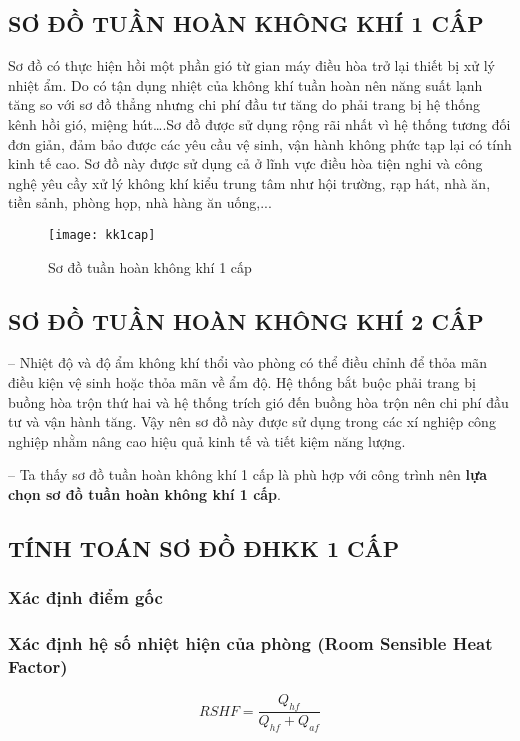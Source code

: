 \subsection{SƠ ĐỒ TUẦN HOÀN KHÔNG KHÍ 1 CẤP}
Sơ đồ có thực hiện hồi một phần gió từ gian máy điều hòa trở lại thiết bị xử lý nhiệt ẩm. Do có tận dụng nhiệt của không khí tuần hoàn nên năng suất lạnh tăng so với sơ đồ thẳng nhưng chi phí đầu tư tăng do phải trang bị hệ thống kênh hồi gió, miệng hút….Sơ đồ được sử dụng rộng rãi nhất vì hệ thống tương đối đơn giản, đảm bảo được các yêu cầu vệ sinh, vận hành không phức tạp lại có tính kinh tế cao. Sơ đồ này được sử dụng cả ở lĩnh vực điều hòa tiện nghi và công nghệ yêu cầy xử lý không khí kiểu trung tâm như hội trường, rạp hát, nhà ăn, tiền sảnh, phòng họp, nhà hàng ăn uống,...
\begin{figure}[H]
	\centering
	\caption{Sơ đồ tuần hoàn không khí 1 cấp}
	\texttt{[image: kk1cap]}
\end{figure}
\subsection{SƠ ĐỒ TUẦN HOÀN KHÔNG KHÍ 2 CẤP}
-- Nhiệt độ và độ ẩm không khí thổi vào phòng có thể điều chỉnh để thỏa mãn điều kiện vệ sinh hoặc thỏa mãn về ẩm độ. Hệ thống bắt buộc phải trang bị buồng hòa trộn thứ hai và hệ thống trích gió đến buồng hòa trộn nên chi phí đầu tư và vận hành tăng. Vậy nên sơ đồ này được sử dụng trong các xí nghiệp công nghiệp nhằm nâng cao hiệu quả kinh tế và tiết kiệm năng lượng.

-- Ta thấy sơ đồ tuần hoàn không khí 1 cấp là phù hợp với công trình nên \textbf{lựa chọn sơ đồ tuần hoàn không khí 1 cấp}.

\subsection{TÍNH TOÁN SƠ ĐỒ ĐHKK 1 CẤP}
\subsubsection{Xác định điểm gốc}
\subsubsection{Xác định hệ số nhiệt hiện của phòng (Room Sensible Heat Factor)}
\begin{equation*}
	RSHF = \dfrac{Q_{hf}}{Q_{hf} + Q_{af}}
\end{equation*}

